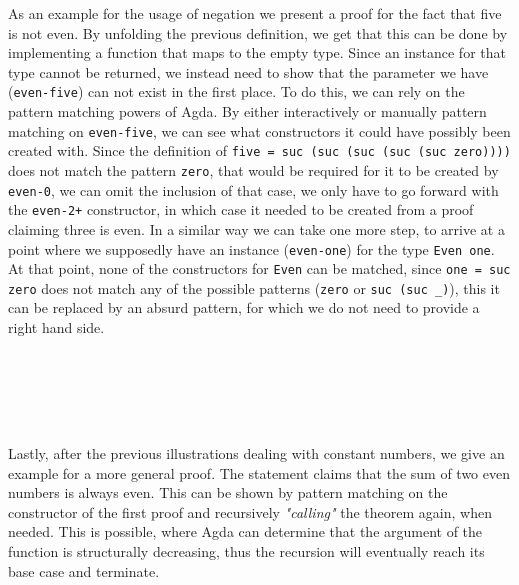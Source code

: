 As an example for the usage of negation we present a proof for the fact that five is not even. By unfolding the previous definition, we get that this can be done by implementing a function that maps to the empty type. Since an instance for that type cannot be returned, we instead need to show that the parameter we have (\verb|even-five|) can not exist in the first place. To do this, we can rely on the pattern matching powers of Agda. By either interactively or manually pattern matching on \verb|even-five|, we can see what constructors it could have possibly been created with. Since the definition of \verb|five = suc (suc (suc (suc (suc zero))))| does not match the pattern \verb|zero|, that would be required for it to be created by \verb|even-0|, we can omit the inclusion of that case, we only have to go forward with the \verb|even-2+| constructor, in which case it needed to be created from a proof claiming three is even. In a similar way we can take one more step, to arrive at a point where we supposedly have an instance (\verb|even-one|) for the type \verb|Even one|. At that point, none of the constructors for \verb|Even| can be matched, since \verb|one = suc zero| does not match any of the possible patterns (\verb|zero| or \verb|suc (suc _)|), this it can be replaced by an absurd pattern, for which we do not need to provide a right hand side.

\begin{code}
    \>[0]\AgdaSpace{}%
    \AgdaSymbol{:}\AgdaSpace{}%
    \AgdaSpace{}%
    \AgdaSpace{}%
    \<%
    \\
    \>[0]\<%
    \\
    \>[0]\<%
    \\
    \>[0]\<%
    \\
    \>[0]\AgdaSpace{}%
    \AgdaSymbol{(}\AgdaSpace{}%
    \AgdaSymbol{(}\AgdaSpace{}%
    \AgdaSymbol{()))}\<%
\end{code}

Lastly, after the previous illustrations dealing with constant numbers, we give an example for a more general proof. The statement claims that the sum of two even numbers is always even. This can be shown by pattern matching on the constructor of the first proof and recursively \textit{"calling"} the theorem again, when needed. This is possible, where Agda can determine that the argument of the function is structurally decreasing, thus the recursion will eventually reach its base case and terminate.

